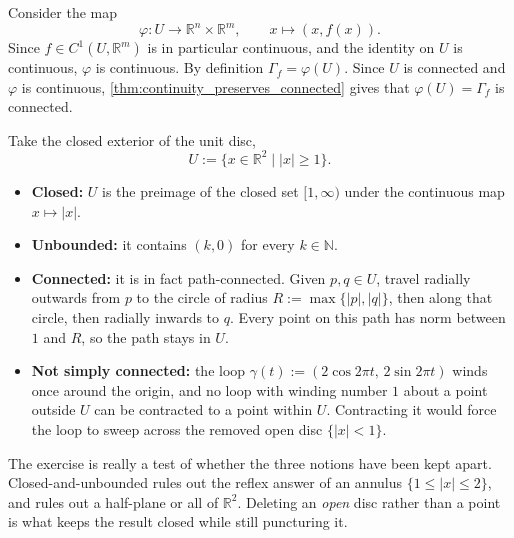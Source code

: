 
\begin{exercisesolution}
\label{sol:connected_graphs}
Consider the map
\[
\varphi : U \to \mathbb{R}^n \times \mathbb{R}^m, \qquad x \mapsto (x, f(x)).
\]
Since $f \in C^1(U,\mathbb{R}^m)$ is in particular continuous, and the identity on $U$ is
continuous, $\varphi$ is continuous. By definition $\Gamma_f = \varphi(U)$. Since $U$ is connected
and $\varphi$ is continuous, \cref{thm:continuity_preserves_connected} gives that $\varphi(U) =
\Gamma_f$ is connected.
\end{exercisesolution}

\begin{exercisesolution}
\label{sol:closed_unbounded_not_simply_connected}
Take the closed exterior of the unit disc,
\[U := \{x \in \mathbb{R}^2 \mid \lvert x\rvert \ge 1\}.\]
\begin{itemize}
  \item \textbf{Closed:} $U$ is the preimage of the closed set $[1,\infty)$ under the continuous map
    $x \mapsto \lvert x\rvert$.
  \item \textbf{Unbounded:} it contains $(k,0)$ for every $k \in \mathbb{N}$.
  \item \textbf{Connected:} it is in fact path-connected. Given $p,q \in U$, travel radially outwards
    from $p$ to the circle of radius $R := \max\{\lvert p\rvert, \lvert q\rvert\}$, then along that
    circle, then radially inwards to $q$. Every point on this path has norm between $1$ and $R$, so
    the path stays in $U$.
  \item \textbf{Not simply connected:} the loop $\gamma(t) := (2\cos 2\pi t,\, 2\sin 2\pi t)$ winds
    once around the origin, and no loop with winding number $1$ about a point outside $U$ can be
    contracted to a point within $U$. Contracting it would force the loop to sweep across the
    removed open disc $\{\lvert x\rvert < 1\}$.
\end{itemize}
\begin{ainote}
The exercise is really a test of whether the three notions have been kept apart. Closed-and-unbounded
rules out the reflex answer of an annulus $\{1 \le \lvert x\rvert \le 2\}$, and  rules out a half-plane or all of $\mathbb{R}^2$. Deleting an \emph{open} disc
rather than a point is what keeps the result closed while still puncturing it.
\end{ainote}
\end{exercisesolution}

